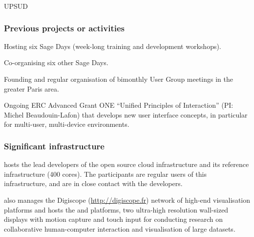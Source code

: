 \begin{sitedescription}{UPSUD}
\subsubsection*{Previous projects or activities}

\begin{compactenum}
\item Hosting six Sage Days (week-long training and development workshops).
\item Co-organising six other Sage Days.
\item Founding and regular organisation of bimonthly \Sage User Group
  meetings in the greater Paris area.
\item {}
Ongoing ERC Advanced Grant ONE ``Unified Principles of Interaction'' (PI: Michel Beaudouin-Lafon) that develops new user interface concepts, in particular for multi-user, multi-device environments.
\end{compactenum}

\subsubsection*{Significant infrastructure}

 hosts the lead developers of the open source
cloud infrastructure  and its reference
infrastructure (400 cores). The participants are regular users
of this infrastructure, and are in close contact with the developers.

 also manages the Digiscope (\url{http://digiscope.fr}) network of high-end visualisation platforms and hosts the  and  platforms, two ultra-high resolution wall-sized displays with motion capture and touch input for conducting research on collaborative human-computer interaction and visualisation of
large datasets.

\end{sitedescription}



